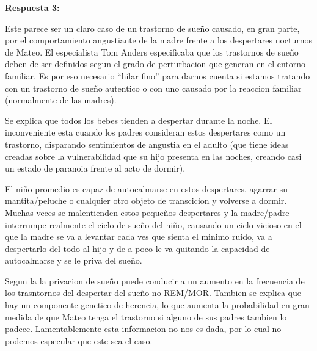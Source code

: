 \documentclass[12pt,a4paper]{article}
\begin{document}
\textbf{Respuesta 3:}

Este parece ser un claro caso de un trastorno de sueño causado, en gran parte, por el comportamiento angustiante de la madre frente a los despertares nocturnos de Mateo. El especialista Tom Anders especificaba que los trastornos de sueño deben de ser definidos segun el grado de perturbacion que generan en el entorno familiar. Es por eso necesario \enquote{hilar fino} para darnos cuenta si estamos tratando con un trastorno de sueño autentico o con uno causado por la reaccion familiar (normalmente de las madres).

Se explica que todos los bebes tienden a despertar durante la noche. El inconveniente esta cuando los padres consideran estos despertares como un trastorno, disparando sentimientos de angustia en el adulto (que tiene ideas creadas sobre la vulnerabilidad que su hijo presenta en las noches, creando casi un estado de paranoia frente al acto de dormir). 

El niño promedio es capaz de autocalmarse en estos despertares, agarrar su mantita/peluche o cualquier otro objeto de transcicion y volverse a dormir. Muchas veces se malentienden estos pequeños despertares y la madre/padre interrumpe realmente el ciclo de sueño del niño, causando un ciclo vicioso en el que la madre se va a levantar cada ves que sienta el minimo ruido, va a despertarlo del todo al hijo y de a poco le va quitando la capacidad de autocalmarse y se le priva del sueño.

Segun la \textcite[p.401]{dsm} la privacion de sueño puede conducir a un aumento en la frecuencia de los trasntornos del despertar del sueño no REM/MOR. Tambien se explica que hay un componente genetico de herencia, lo que aumenta la probabilidad en gran medida de que Mateo tenga el trastorno si alguno de sus padres tambien lo padece. Lamentablemente esta informacion no nos es dada, por lo cual no podemos especular que este sea el caso. 





\newpage
\end{document}
